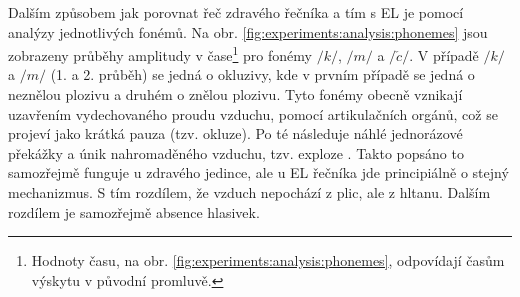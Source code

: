 Dalším způsobem jak porovnat řeč zdravého řečníka a tím s EL je pomocí analýzy jednotlivých fonémů. Na obr. \ref{fig:experiments:analysis:phonemes} jsou zobrazeny průběhy amplitudy v čase\footnote{Hodnoty času, na obr. \ref{fig:experiments:analysis:phonemes}, odpovídají časům výskytu v původní promluvě.} pro fonémy $/k/$, $/m/$ a $/\check{c}/$. V případě $/k/$ a $/m/$ (1. a 2. průběh) se jedná o okluzivy, kde v prvním případě se jedná o neznělou plozivu a druhém o znělou plozivu. Tyto fonémy obecně vznikají uzavřením vydechovaného proudu vzduchu, pomocí artikulačních orgánů, což se projeví jako krátká pauza (tzv. okluze). Po té následuje náhlé jednorázové překážky a únik nahromaděného vzduchu, tzv. exploze \cite{Psutka2006}. Takto popsáno to samozřejmě funguje u zdravého jedince, ale u EL řečníka jde principiálně o stejný mechanizmus. S tím rozdílem, že vzduch nepochází z plic, ale z hltanu. Dalším rozdílem je samozřejmě absence hlasivek.

